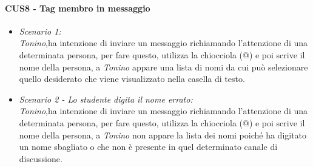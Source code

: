 \paragraph{CUS8 - Tag membro in messaggio\\}
\begin{itemize}
	\item \textit{Scenario 1:\\}
	\textit{Tonino},ha intenzione di inviare un messaggio richiamando l’attenzione di una determinata persona, per fare questo, utilizza la chiocciola (@) e poi scrive il nome della persona, a \textit{Tonino} appare una lista di nomi da cui può selezionare quello desiderato che viene visualizzato nella casella di testo.\\
	
	\item \textit{Scenario 2 - Lo studente digita il nome errato:\\}
	\textit{Tonino},ha intenzione di inviare un messaggio richiamando l’attenzione di una determinata persona, per fare questo, utilizza la chiocciola (@) e poi scrive il nome della persona, a \textit{Tonino} non appare la lista dei nomi poiché ha digitato un nome sbagliato o che non è presente in quel determinato canale di discussione.\\
	
\end{itemize}


